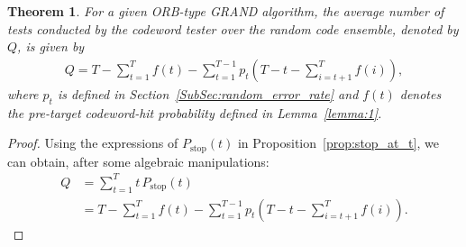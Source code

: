 \documentclass[letterpaper,draftclsnofoot,onecolumn]{IEEEtran}
\newtheorem{theorem}{Theorem}%
\begin{document}
\begin{theorem}\label{th:ave_guess_num}
For a given ORB-type GRAND algorithm, the average number of tests conducted by the codeword tester over the random code ensemble, denoted by $Q$, is given by
\begin{align}
Q = T-\sum_{t=1}^{T}f(t) - \sum_{t=1}^{T-1}p_t \left( T-t-\sum_{i=t+1}^{T}f(i) \right),
\end{align}
where $p_t$ is defined in Section~\ref{SubSec:random_error_rate} and
$f(t)$ denotes the pre-target codeword-hit probability defined in
Lemma~\ref{lemma:1}.
\end{theorem}
\begin{proof}
    Using the expressions of $P_{\text{stop}}(t)$ in Proposition~\ref{prop:stop_at_t}, we can obtain, after some algebraic manipulations:
    \begin{align}
        Q & = \sum_{t=1}^{T}t\, P_{\text{stop}}(t) \\
        & = T- \sum_{t=1}^{T} f(t) - \sum_{t=1}^{T-1}p_t\left(T -t - \sum_{i=t+1} ^{T}f(i)\right). \label{eq:length.5}
    \end{align}
\end{proof}
\end{document}
